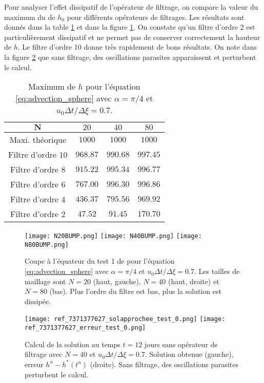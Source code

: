 Pour analyser l'effet dissipatif de l'opérateur de filtrage, on compare la valeur du maximum du de $h_0$ pour différents opérateurs de filtrages. Les résultats sont donnés dans la table \ref{tab:max_bump} et dans la figure \ref{fig:max_bump}. On constate qu'un filtre d'ordre 2 est particulièrement dissipatif et ne permet pas de conserver correctement la hauteur de $h$. Le filtre d'ordre 10 donne très rapidement de bons résultats. On note dans la figure \ref{fig:parasite_bump} que sans filtrage, des oscillations parasites apparaissent et perturbent le calcul.

\begin{table}[htbp]
\begin{center}
\begin{tabular}{|c||ccc|}
\hline 
$\mathbf{N}$ & $20$ & $40$ & $80$ \\ 
\hline 
\hline 
Maxi. théorique & $1000$ & $1000$ & $1000$ \\ 
Filtre d'ordre $10$ & $968.87$ & $990.68$ & $997.45$ \\ 
Filtre d'ordre $8$ & $915.22$ & $995.34$ & $996.77$ \\ 
Filtre d'ordre $6$ & $767.00$ & $996.30$ & $996.86$ \\  
Filtre d'ordre $4$ & $436.37$ & $795.56$ & $969.92$ \\ 
Filtre d'ordre $2$ & $47.52$ & $91.45$ & $170.70$ \\ 
\hline 
\end{tabular} 
\end{center}
\caption{Maximum de $h$ pour l'équation \eqref{eq:advection_sphere} avec $\alpha = \pi / 4$ et $u_0 \Delta t / \Delta \xi = 0.7$.}
\label{tab:max_bump}
\end{table} 

\begin{figure}[htbp]
\begin{center}
\texttt{[image: N20BUMP.png]}
\texttt{[image: N40BUMP.png]}
\texttt{[image: N80BUMP.png]}
\end{center}
\caption{Coupe à l'équateur du test 1 de \cite{Williamson1992} pour l'équation \eqref{eq:advection_sphere} avec $\alpha = \pi / 4$ et $u_0 \Delta t / \Delta \xi = 0.7$. Les tailles de maillage sont $N=20$ (haut, gauche), $N=40$ (haut, droite) et $N=80$ (bas). Plus l'ordre du filtre est bas, plus la solution est dissipée.}
\label{fig:max_bump}
\end{figure}

\begin{figure}[htbp]
\begin{center}
\texttt{[image: ref\_7371377627\_solapprochee\_test\_0.png]}
\texttt{[image: ref\_7371377627\_erreur\_test\_0.png]}
\end{center}
\caption{Calcul de la solution au temps $t=12$ jours sans opérateur de filtrage avec $N=40$ et $u_0 \Delta t/ \Delta \xi = 0.7$. Solution obtenue (gauche), erreur $h^n - h^*(t^n)$ (droite). Sans filtrage, des oscillations parasites perturbent le calcul.}
\label{fig:parasite_bump}
\end{figure}

